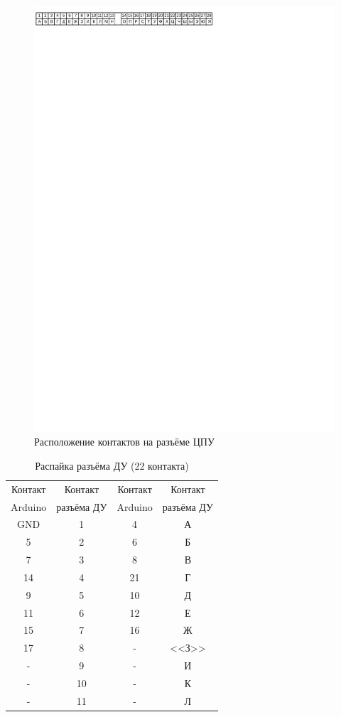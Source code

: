 \documentclass[12pt, a4paper]{article}
\begin{document}
\begin{figure}
\begin{center}
\includegraphics[width=\textwidth, clip, viewport=0 800 360 830]{cpu-jack}
\end{center}
\caption{Расположение контактов на разъёме ЦПУ}
\label{pic-cpu-jack}
\end{figure}

\begin{table}
\begin{center}
\caption{Распайка разъёма ДУ (22 контакта)}
\begin{tabular}{cccc}
\hline \hline
Контакт & Контакт & Контакт & Контакт \\
Arduino & разъёма ДУ & Arduino & разъёма ДУ \\
\hline
GND & 1 & 4 & А \\
5 & 2 & 6 & Б \\
7 & 3 & 8 & В \\
14 & 4 & 21 & Г \\
9 & 5 & 10 & Д \\
11 & 6 & 12 & Е \\
15 & 7 & 16 & Ж \\
17 & 8 & - & <<З>> \\
- & 9 & - & И \\
- & 10 & - & К \\
- & 11 & - & Л \\
\hline \hline
\end{tabular}
\label{tab_rc_wires}
\end{center}
\end{table}
\end{document}
